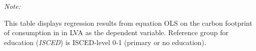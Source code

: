 \begin{table}[htbp!]
\begin{adjustbox}{width = 1\textwidth, max height = 0.95\textheight, center}
\begin{threeparttable}[b]
         \begin{tablenotes}\item \medskip \textit{Note:}
            \item This table displays regression results from equation OLS on the carbon footprint of consumption in  in LVA as the dependent variable.  Reference group for education (\textit{ISCED}) is ISCED-level 0-1 (primary or no education).
         \end{tablenotes}
      \end{threeparttable}
   \end{adjustbox}
\end{table}


